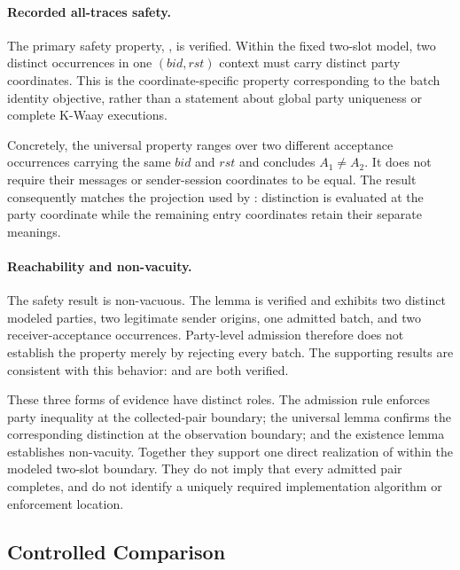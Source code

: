 \paragraph{Recorded all-traces safety.}
The primary safety property,
, is verified.
Within the fixed two-slot model, two distinct \receiveraccept occurrences in
one \((\mathit{bid},\mathit{rst})\) context must carry distinct party
coordinates. This is the coordinate-specific property corresponding to the
batch identity objective, rather than a statement about global party
uniqueness or complete K-Waay executions.

Concretely, the universal property ranges over two different acceptance
occurrences carrying the same \(\mathit{bid}\) and \(\mathit{rst}\) and
concludes $A_1\neq A_2$. It does not require their messages or sender-session
coordinates to be equal. The result consequently matches the projection used
by \distinctparty: distinction is evaluated at the party coordinate while the
remaining entry coordinates retain their separate meanings.

\paragraph{Reachability and non-vacuity.}
The safety result is non-vacuous. The lemma
 is verified and exhibits
two distinct modeled parties, two legitimate sender origins, one admitted
batch, and two receiver-acceptance occurrences. Party-level admission
therefore does not establish the property merely by rejecting every batch.
The supporting results are consistent with this behavior:
 and
 are both verified.

These three forms of evidence have distinct roles. The admission rule enforces
party inequality at the collected-pair boundary; the universal lemma confirms
the corresponding distinction at the \receiveraccept observation boundary;
and the existence lemma establishes non-vacuity. Together they support one
direct realization of \distinctparty within the modeled two-slot boundary.
They do not imply that every admitted pair completes, and do not identify a
uniquely required implementation algorithm or enforcement location.

\subsection{Controlled Comparison}

